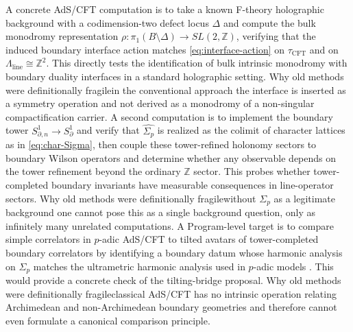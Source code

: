 \documentclass[11pt]{article}
\theoremstyle{remark}
\newcommand{\Z}{\mathbb{Z}}
\begin{document}
A concrete AdS/CFT computation is to take a known F-theory holographic background with a codimension-two defect locus \(\Delta\) and compute the bulk monodromy representation \(\rho:\pi_{1}(B\setminus\Delta)\to SL(2,\Z)\), verifying that the induced boundary interface action matches \eqref{eq:interface-action} on \(\tau_{\mathrm{CFT}}\) and on \(\Lambda_{\mathrm{line}}\cong \Z^{2}\). This directly tests the identification of bulk intrinsic monodromy with boundary duality interfaces in a standard holographic setting. Why old methods were definitionally fragile\:in the conventional approach the interface is inserted as a symmetry operation and not derived as a monodromy of a non-singular compactification carrier. A second computation is to implement the boundary tower \(S^{1}_{\partial,n}\to S^{1}_{\partial}\) and verify that \(\widehat{\Sigma_{p}}\) is realized as the colimit of character lattices as in \eqref{eq:char-Sigma}, then couple these tower-refined holonomy sectors to boundary Wilson operators and determine whether any observable depends on the tower refinement beyond the ordinary \(\Z\) sector. This probes whether tower-completed boundary invariants have measurable consequences in line-operator sectors. Why old methods were definitionally fragile\:without \(\Sigma_{p}\) as a legitimate background one cannot pose this as a single background question, only as infinitely many unrelated computations. A Program-level target is to compare simple correlators in \(p\)-adic AdS/CFT to tilted avatars of tower-completed boundary correlators by identifying a boundary datum whose harmonic analysis on \(\Sigma_{p}\) matches the ultrametric harmonic analysis used in \(p\)-adic models \cite{Gubser2017, Heydeman2018}. This would provide a concrete check of the tilting-bridge proposal. Why old methods were definitionally fragile\:classical AdS/CFT has no intrinsic operation relating Archimedean and non-Archimedean boundary geometries and therefore cannot even formulate a canonical comparison principle.
\end{document}
